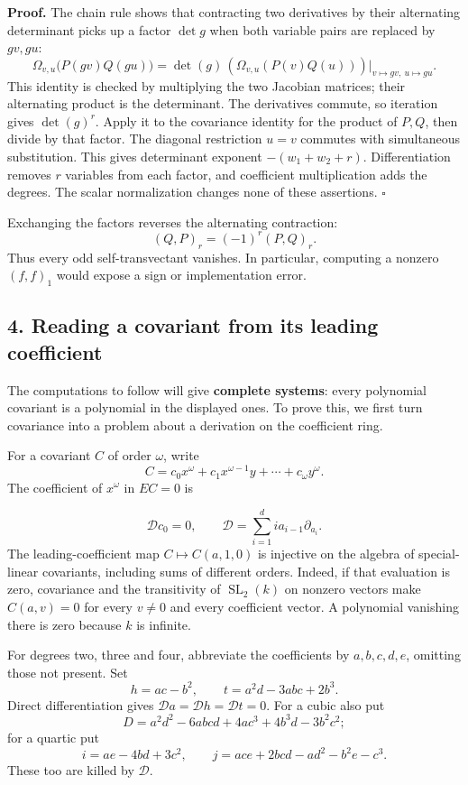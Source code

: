 \documentclass[
]{article}
\begin{document}
\textbf{Proof.} The chain rule shows that contracting two derivatives by
their alternating determinant picks up a factor \(\det g\) when both
variable pairs are replaced by \(gv,gu\): \[
\Omega_{v,u}\bigl(P(gv)Q(gu)\bigr)
=\det(g)\,(\Omega_{v,u}(P(v)Q(u)))\big|_{v\mapsto gv,\ u\mapsto gu}.
\] This identity is checked by multiplying the two Jacobian matrices;
their alternating product is the determinant. The derivatives commute,
so iteration gives \(\det(g)^r\). Apply it to the covariance identity
for the product of \(P,Q\), then divide by that factor. The diagonal
restriction \(u=v\) commutes with simultaneous substitution. This gives
determinant exponent \(-(w_1+w_2+r)\). Differentiation removes \(r\)
variables from each factor, and coefficient multiplication adds the
degrees. The scalar normalization changes none of these assertions.
\(\square\)

Exchanging the factors reverses the alternating contraction: \[
(Q,P)_r=(-1)^r(P,Q)_r.
\] Thus every odd self-transvectant vanishes. In particular, computing a
nonzero \((f,f)_1\) would expose a sign or implementation error.

\subsection{4. Reading a covariant from its leading
coefficient}\label{section-4}

The computations to follow will give \textbf{complete systems}: every
polynomial covariant is a polynomial in the displayed ones. To prove
this, we first turn covariance into a problem about a derivation on the
coefficient ring.

For a covariant \(C\) of order \(\omega\), write \[
C=c_0x^\omega+c_1x^{\omega-1}y+\cdots+c_\omega y^\omega.
\] The coefficient of \(x^\omega\) in \(EC=0\) is
\protect{}\label{equation-B5}{}

\[
\mathcal D c_0=0,\qquad
\mathcal D=\sum_{i=1}^d i a_{i-1}\partial_{a_i}.
\tag{B5}
\] The leading-coefficient map \(C\mapsto C(a,1,0)\) is injective on the
algebra of special-linear covariants, including sums of different
orders. Indeed, if that evaluation is zero, covariance and the
transitivity of \(\operatorname{SL}_2(k)\) on nonzero vectors make
\(C(a,v)=0\) for every \(v\ne0\) and every coefficient vector. A
polynomial vanishing there is zero because \(k\) is infinite.

For degrees two, three and four, abbreviate the coefficients by
\(a,b,c,d,e\), omitting those not present. Set \[
h=ac-b^2,\qquad t=a^2d-3abc+2b^3.
\] Direct differentiation gives
\(\mathcal Da=\mathcal Dh=\mathcal Dt=0\). For a cubic also put \[
D=a^2d^2-6abcd+4ac^3+4b^3d-3b^2c^2;
\] for a quartic put \[
i=ae-4bd+3c^2,\qquad
j=ace+2bcd-ad^2-b^2e-c^3.
\] These too are killed by \(\mathcal D\).
\end{document}
